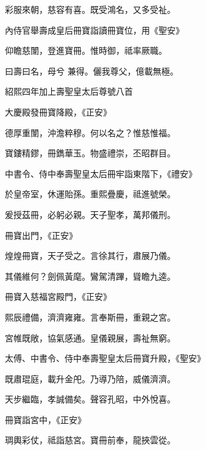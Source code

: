 \begin{pinyinscope}
 彩服來朝，慈容有喜。既受鴻名，又多受祉。



 內侍官舉壽成皇后冊寶詣讀冊寶位，用《聖安》



 仰瞻慈闈，登進寶冊。惟時御，祗率厥職。



 曰壽曰名，母兮
 兼得。儷我尊父，億載無極。



 紹熙四年加上壽聖皇太后尊號八首



 大慶殿發冊寶降殿，《正安》



 德厚重闈，沖澹粹穆。何以名之？惟慈惟福。



 寶鏤精鏐，冊鐫華玉。物盛禮崇，丕昭群目。



 中書令、侍中奉壽聖皇太后冊牢詣東階下，《禮安》



 於皇帝室，休運貽孫。重熙疊慶，祗進號榮。



 爰授茲冊，必躬必親。天子聖孝，萬邦儀刑。



 冊寶出門，《正安》



 煌煌冊寶，天子受之。言徐其行，肅展乃儀。



 其儀維何？劍佩黃麾。鸞駕清蹕，聳瞻九逵。



 冊寶入慈福宮殿門，《正安》



 熙辰禮備，濟濟雍雍。言奉斯冊，重親之宮。



 宮帷既敞，協氣感通。皇儀親展，壽祉無窮。



 太傅、中書令、侍中奉壽聖皇太后冊寶升殿，《聖安》



 既肅琨庭，載升金戺。乃導乃陪，威儀濟濟。



 天步繼臨，孝誠備矣。聲容孔昭，中外悅喜。



 冊寶詣宮中，《正安》



 琱輿彩仗，祗詣慈宮。寶冊前奉，龍挾雲從。




\end{pinyinscope}
